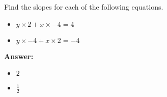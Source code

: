  Find the slopes for each of the following equations. \begin{itemize}\item \( y \times 2 + x \times -4 = 4 \)\item \( y \times -4 + x \times 2 = -4 \)\end{itemize}

        \textbf{Answer:} \begin{itemize}\item \( 2 \)\item \( \frac{1}{2} \)\end{itemize}
